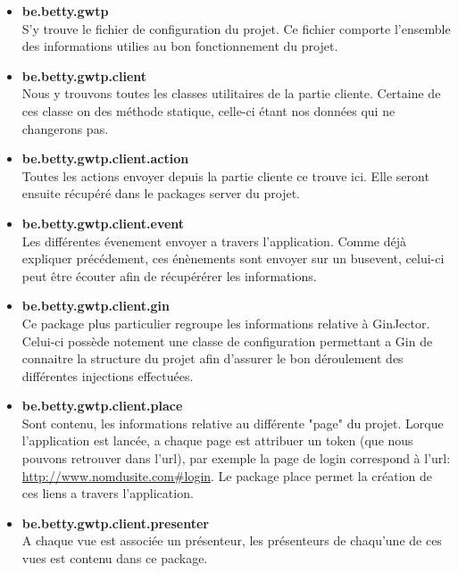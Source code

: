 \begin{itemize}
\item \textbf{be.betty.gwtp}\\
	S'y trouve le fichier de configuration du projet. Ce fichier comporte l'ensemble des informations utilies au bon fonctionnement du projet.\\
	
\item \textbf{be.betty.gwtp.client}\\
	Nous y trouvons toutes les classes utilitaires de la partie cliente. Certaine de ces classe on des méthode statique, celle-ci étant nos données qui ne changerons pas.\\
	
\item \textbf{be.betty.gwtp.client.action}\\
	Toutes les actions envoyer depuis la partie cliente ce trouve ici. Elle seront ensuite récupéré dans le packages server du projet.\\
	
\item \textbf{be.betty.gwtp.client.event}\\
	Les différentes évenement envoyer a travers l'application. Comme déjà expliquer précédement, ces énènements sont envoyer sur un busevent, celui-ci peut être écouter afin de récupérérer les informations.\\
	
\item \textbf{be.betty.gwtp.client.gin}\\
	Ce package plus particulier regroupe les informations relative à GinJector. Celui-ci possède notement une classe de configuration permettant a Gin de connaitre la structure du projet afin d'assurer le bon déroulement des différentes injections effectuées.\\
	
\item \textbf{be.betty.gwtp.client.place}\\
Sont contenu, les informations relative au différente "page" du projet. Lorque l'application est lancée, a chaque page est attribuer un token (que nous pouvons retrouver dans l'url), par exemple la page de login correspond à l'url: \url{http://www.nomdusite.com\#login}. Le package place permet la création de ces liens a travers l'application.\\

\item \textbf{be.betty.gwtp.client.presenter}\\
A chaque vue est associée un présenteur, les présenteurs de chaqu'une de ces vues est contenu dans ce package.\\


\end{itemize}
